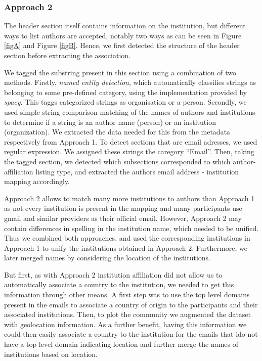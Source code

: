 \documentclass[article,twocolumn]{IEEEtran}
\begin{document}
    \hypertarget{approach-2}{%
\subsubsection{Approach 2}\label{approach-2}}

The header section itself contains information on the institution, but
different ways to list authors are accepted, notably two ways as can be
seen in Figure \ref{figA} and Figure \ref{figB}. Hence, we first
detected the structure of the header section before extracting the
association.

We tagged the substring present in this section using a combination of
two methods. Firstly, \emph{named entity detection}, which automatically
classifies strings as belonging to some pre-defined category, using the
implementation provided by \emph{spacy}\cite{spacy2}. This taggs
categorized strings as organisation or a person. Secondly, we used
simple string comparison matching of the names of authors and
institutions to determine if a string is an author name (person) or an
institution (organization). We extracted the data needed for this from
the metadata respectively from Approach 1. To detect sections that are
email adresses, we used regular expression. We assigned these strings
the caregory ``Email''. Then, taking the tagged section, we detected
which subsections corresponded to which author-affiliation listing type,
and extracted the authors email address - institution mapping
accordingly.

Approach 2 allows to match many more institutions to authors than
Approach 1 as not every institution is present in the mapping and many
participants use gmail and similar providers as their official email.
However, Approach 2 may contain differences in spelling in the
institution name, which needed to be unified. Thus we combined both
approaches, and used the corresponding institutions in Approach 1 to
unify the institutions obtained in Approach 2. Furthermore, we later
merged names by considering the location of the institutions.

But first, as with Approach 2 institution affiliation did not allow us
to automatically associate a country to the institution, we needed to
get this information through other means. A first step was to use the
top level domains present in the emails to associate a country of origin
to the participants and their associated institutions. Then, to plot the
community we augmented the dataset with geolocation information. As a
further benefit, having this information we could then easily associate
a country to the institution for the emails that ido not have a top
level domain indicating location and further merge the names of
institutions based on location.
\end{document}
